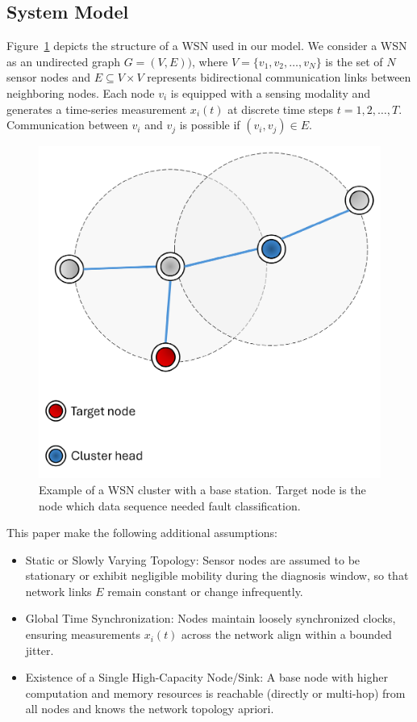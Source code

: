 \subsection{System Model}
Figure~\ref{fig:wsn} depicts the structure of a WSN used in our model. We consider a WSN as an undirected graph \(G=(V,E))\), where \(V=\{v_1, v_2, \ldots, v_N\}\) is the set of \(N\) sensor nodes and \(E \subseteq V \times V\) represents bidirectional communication links between neighboring nodes. Each node \(v_i\) is equipped with a sensing modality and generates a time-series measurement \(x_i(t)\) at discrete time steps \(t=1, 2, \ldots, T\). Communication between \(v_i\) and \(v_j\) is possible if \((v_i,v_j) \in E\).

\begin{figure}
\centering
\includegraphics[width=0.6\linewidth]{images/WSN.png}
\caption{Example of a WSN cluster with a base station. Target node is the node which data sequence needed fault classification.}
\label{fig:wsn}
\end{figure}

This paper make the following additional assumptions:
\begin{itemize}
\item Static or Slowly Varying Topology: Sensor nodes are assumed to be stationary or exhibit negligible mobility during the diagnosis window, so that network links \(E\) remain constant or change infrequently.
\item Global Time Synchronization: Nodes maintain loosely synchronized clocks, ensuring measurements \(x_i(t)\) across the network align within a bounded jitter.
\item Existence of a Single High-Capacity Node/Sink: A base node with higher computation and memory resources is reachable (directly or multi-hop) from all nodes and knows the network topology apriori.
\end{itemize}

